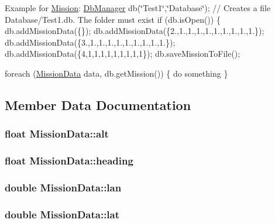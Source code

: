 Example for \hyperlink{class_mission}{Mission}\+: \hyperlink{class_db_manager}{Db\+Manager} db(\char`\"{}\+Test1\char`\"{},\char`\"{}\+Database\char`\"{}); // Creates a file Database/\+Test1.\+db. The folder must exist if (db.\+is\+Open()) \{ db.\+add\+Mission\+Data(\{\}); db.\+add\+Mission\+Data(\{2.,1.,1.,1.,1.,1.,1.,1.,1.,1.\}); db.\+add\+Mission\+Data(\{3.,1.,1.,1.,1.,1.,1.,1.,1.,1.\}); db.\+add\+Mission\+Data(\{4,1,1,1,1,1,1,1,1,1\}); db.\+save\+Mission\+To\+File();

foreach (\hyperlink{struct_mission_data}{Mission\+Data} data, db.\+get\+Mission()) \{ do something \} 

\subsection{Member Data Documentation}
\hypertarget{struct_mission_data_ad4f9f598f5960f26fc8290180a7cfd18}{}
\subsubsection[{alt}]{\setlength{\rightskip}{0pt plus 5cm}float Mission\+Data\+::alt}\label{struct_mission_data_ad4f9f598f5960f26fc8290180a7cfd18}
\hypertarget{struct_mission_data_aca98e398b94037e80749d0a9e73dcefe}{}
\subsubsection[{heading}]{\setlength{\rightskip}{0pt plus 5cm}float Mission\+Data\+::heading}\label{struct_mission_data_aca98e398b94037e80749d0a9e73dcefe}
\hypertarget{struct_mission_data_a7fcee2655bd219b949d4a697ecc70a67}{}
\subsubsection[{lan}]{\setlength{\rightskip}{0pt plus 5cm}double Mission\+Data\+::lan}\label{struct_mission_data_a7fcee2655bd219b949d4a697ecc70a67}
\hypertarget{struct_mission_data_a36cf42a5d8fd328293d296c67239af9b}{}
\subsubsection[{lat}]{\setlength{\rightskip}{0pt plus 5cm}double Mission\+Data\+::lat}\label{struct_mission_data_a36cf42a5d8fd328293d296c67239af9b}
\hypertarget{struct_mission_data_a43974cedf16a4aa6645145224a4c3e77}{}
